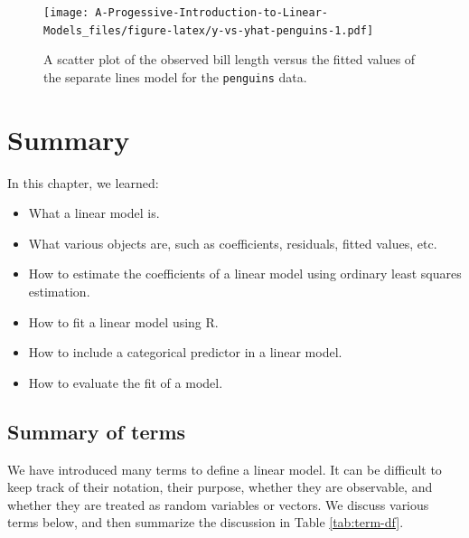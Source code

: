 \documentclass[
]{book}
\newenvironment{Shaded}{\begin{snugshade}}{\end{snugshade}}
\newcommand{\AttributeTok}[1]{\textcolor[rgb]{0.77,0.63,0.00}{#1}}
\newcommand{\FunctionTok}[1]{\textcolor[rgb]{0.00,0.00,0.00}{#1}}
\newcommand{\NormalTok}[1]{#1}
\newcommand{\SpecialCharTok}[1]{\textcolor[rgb]{0.00,0.00,0.00}{#1}}
\newcommand{\StringTok}[1]{\textcolor[rgb]{0.31,0.60,0.02}{#1}}
\providecommand{\tightlist}{%
  \setlength{\itemsep}{0pt}\setlength{\parskip}{0pt}}
\theoremstyle{definition}
\theoremstyle{definition}
\theoremstyle{definition}
\theoremstyle{definition}
\theoremstyle{remark}
\begin{document}
\begin{Shaded}
\end{Shaded}

\begin{figure}
\centering
\texttt{[image: A-Progessive-Introduction-to-Linear-Models\_files/figure-latex/y-vs-yhat-penguins-1.pdf]}
\caption{\label{fig:y-vs-yhat-penguins}A scatter plot of the observed bill length versus the fitted values of the separate lines model for the \texttt{penguins} data.}
\end{figure}

\hypertarget{summary}{%
\section{Summary}\label{summary}}

In this chapter, we learned:

\begin{itemize}
\tightlist
\item
  What a linear model is.
\item
  What various objects are, such as coefficients, residuals, fitted values, etc.
\item
  How to estimate the coefficients of a linear model using ordinary least squares estimation.
\item
  How to fit a linear model using R.
\item
  How to include a categorical predictor in a linear model.
\item
  How to evaluate the fit of a model.
\end{itemize}

\hypertarget{ss:term-summary}{%
\subsection{Summary of terms}\label{ss:term-summary}}

We have introduced many terms to define a linear model. It can be difficult to keep track of their notation, their purpose, whether they are observable, and whether they are treated as random variables or vectors. We discuss various terms below, and then summarize the discussion in Table \ref{tab:term-df}.
\end{document}
